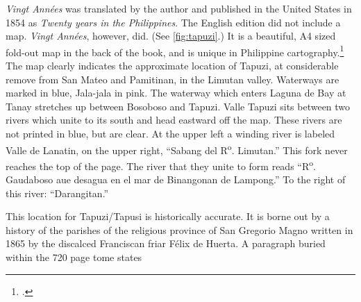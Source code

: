 \begin{figure*}[p]
    \centering
\end{figure*}

\textit{Vingt Ann\'ees} was translated by the author and published in the United States in 1854 as \textit{Twenty years in the Philippines}. The English edition did not include a map. \textit{Vingt Ann\'ees}, however, did. (See \cref{fig:tapuzi}.) It is a beautiful, A4 sized fold-out map in the back of the book, and is unique in Philippine cartography.\footcite{Gironiere1853} The map clearly indicates the approximate location of Tapuzi, at considerable remove from San Mateo and Pamitinan, in the Limutan valley. Waterways are marked in blue, Jala-jala in pink. The waterway which enters Laguna de Bay at Tanay stretches up between Bosoboso and Tapuzi. Valle Tapuzi sits between two rivers which unite to its south and head eastward off the map. These rivers are not printed in blue, but are clear. At the upper left a winding river is labeled Valle de Lanatin, on the upper right, \enquote{Sabang del R\textsuperscript{o}. Limutan.} This fork never reaches the top of the page.  The river that they unite to form reads \enquote{R\textsuperscript{o}.  Gaudaboso aue desagua en el mar de Binangonan de Lampong.} To the right of this river: \enquote{Darangitan.} 

This location for Tapuzi/Tapusi is historically accurate. It is borne out by a history of the parishes of the religious province of San Gregorio Magno written in 1865 by the discalced Franciscan friar F\'elix de Huerta. A paragraph buried within the 720 page tome states

